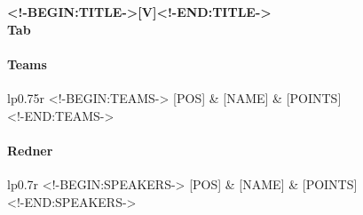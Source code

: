 \documentclass[ngerman,twocolumn,paper=a4,11pt]{scrartcl}
\begin{document}
\begin{center}
  \bfseries\huge{}
  <!-BEGIN:TITLE->[V]<!-END:TITLE->\\
  Tab
\end{center}
\paragraph{Teams}
\begin{center}
  \begin{supertabular}{lp{0.75\linewidth}r}
    \toprule
    <!-BEGIN:TEAMS->
    [POS] & [NAME] \vspace{-0.5em}  & \makebox[0pt][r]{$^{\text{\emph{[BREAKMARK]}}}$} [POINTS]\\
    <!-END:TEAMS->
    \bottomrule
  \end{supertabular}
\end{center}

\paragraph{Redner}
\begin{center}
  \begin{supertabular}{lp{0.7\linewidth}r}
    \toprule
    <!-BEGIN:SPEAKERS->
    [POS] & [NAME] \vspace{-0.5em}  & \makebox[0pt][r]{$^{\text{\emph{[BREAKMARK]}}}$} [POINTS] \\
    <!-END:SPEAKERS->
    \bottomrule
  \end{supertabular}
\end{center}
\end{document}
